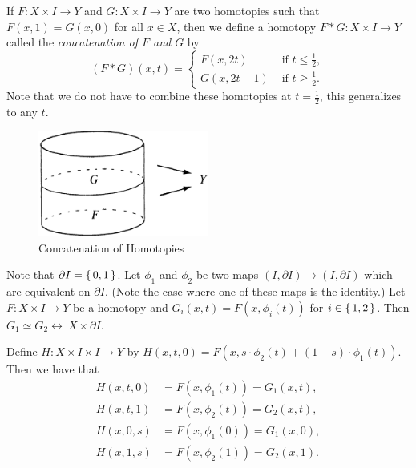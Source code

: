 \documentclass[letterpaper, 11pt, oneside]{book}
\begin{document}
\begin{defn}[Concatenation]
  If $F\colon X \times I \to Y$ and $G\colon X \times I \to Y$ are two homotopies such that $F(x, 1) = G(x, 0)$ for all $x \in X$, then we define a homotopy $F * G\colon X \times I \to Y$ called the \emph{concatenation of $F$ and $G$} by
  \[
    (F * G)(x, t) =
    \begin{cases}
      F(x, 2t)      & \text{ if } t \leq \frac{1}{2}, \\
      G(x, 2t - 1)  & \text{ if } t \geq \frac{1}{2}.
    \end{cases}
  \]
  Note that we do not have to combine these homotopies at $t = \frac{1}{2}$, this generalizes to any $t$.
  \begin{figure}[ht]
    \centering
    \includegraphics[width=0.5\textwidth]{figs/concatenation.png}
    \caption{Concatenation of Homotopies~\cite{book:Bredon}}\label{fig:concatenation}
  \end{figure}
\end{defn}

\begin{lem}\label{lem: reparametrization}
  Note that $\partial I = \set{0, 1}$.
  Let $\phi_{1}$ and $\phi_{2}$ be two maps $(I, \partial I) \to (I, \partial I)$ which are equivalent on $\partial I$.
  (Note the case where one of these maps is the identity.)
  Let $F\colon X \times I \to Y$ be a homotopy and $G_{i}(x, t) = F(x, \phi_{i}(t))$ for $i \in \set{1, 2}$.
  Then $G_{1} \simeq G_{2} \rel\ X \times \partial I$.
\end{lem}
\begin{pf}
  Define $H\colon X \times I \times I \to Y$ by $H(x, t, 0) = F(x, s \cdot \phi_{2}(t) + (1 - s) \cdot \phi_{1}(t))$.
  Then we have that
  \begin{align*}
    H(x, t, 0) &= F(x, \phi_{1}(t)) = G_{1}(x, t), \\
    H(x, t, 1) &= F(x, \phi_{2}(t)) = G_{2}(x, t), \\
    H(x, 0, s) &= F(x, \phi_{1}(0)) = G_{1}(x, 0), \\
    H(x, 1, s) &= F(x, \phi_{2}(1)) = G_{2}(x, 1).
  \end{align*}
\end{pf}
\end{document}
